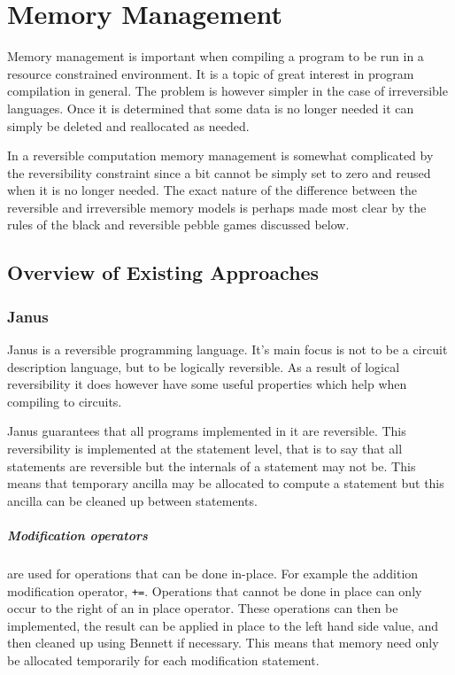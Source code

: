 \chapter{Memory Management}

Memory management is important when compiling a program to be run in a resource
constrained environment. It is a topic of great interest in program compilation
in general. The problem is however simpler in the case of irreversible
languages. Once it is determined that some data is no longer needed it can
simply be deleted and reallocated as needed.

In a reversible computation memory management is somewhat complicated by the
reversibility constraint since a bit cannot be simply set to zero and reused
when it is no longer needed. The exact nature of the difference between the
reversible and irreversible memory models is perhaps made most clear by the
rules of the black and reversible pebble games discussed below.

\section{Overview of Existing Approaches}

\subsection{Janus}
Janus\cite{YG:2007,LD:1982} is a reversible programming
language.  It's main focus is not to be a circuit description language, but to
be logically reversible. As a result of logical reversibility it does however have some
useful properties which help when compiling to circuits.

Janus guarantees that all programs implemented in it are reversible.
This reversibility is implemented at the statement level, that is to say that
all statements are reversible but the internals of a statement may not be.
This means that temporary ancilla may be allocated to compute a statement but
this ancilla can be cleaned up between statements.

\paragraph{Modification operators} are used for operations that can be done
in-place. For example the addition modification operator, \verb|+=|. Operations
that cannot be done in place can only occur to the right of an in place
operator. These operations can then be implemented, the result can be applied in
place to the left hand side value, and then cleaned up using Bennett if
necessary. This means that memory need only be allocated temporarily for each
modification statement.

